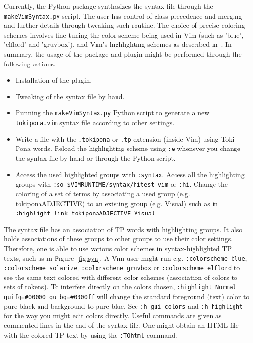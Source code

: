 \documentclass{article}
\newcommand{\tttt}[1]{\texttt{#1}}
\begin{document}
Currently, the Python package synthesizes the
syntax file through the\\ \tttt{makeVimSyntax.py} script.
The user has control of class precedence and
merging and further details through tweaking such routine.
The choice of precise coloring schemes
involves fine tuning the color scheme being
used in Vim (such as 'blue', 'elflord' and 'gruvbox'),
and Vim's highlighting schemes as described in~\cite{vim}.
In summary,
the usage of the package and plugin might be performed
through the following actions:
\begin{itemize}
  \item Installation of the plugin.
  \item Tweaking of the syntax file by hand.
  \item Running the \tttt{makeVimSyntax.py}
    Python script to generate a new \tttt{tokipona.vim} syntax file
    according to other settings.
  \item Write a file with the \tttt{.tokipona} or \tttt{.tp} extension
    (inside Vim) using Toki Pona words.
    Reload the highlighting scheme using \tttt{:e} whenever you
    change the syntax file by hand or through the Python script.
  \item Access the used highlighted groups with \tttt{:syntax}.
    Access all the highlighting groups with \tttt{:so
    \$VIMRUNTIME/syntax/hitest.vim} or \tttt{:hi}.
    Change the coloring of a set of terms by associating
    a used group (e.g. tokiponaADJECTIVE) to an existing group (e.g.
    Visual) such as in \tttt{:highlight link tokiponaADJECTIVE Visual}.
\end{itemize}

The syntax file has an association of TP
words with highlighting groups.
It also holds associations of these groups to other groups
to use their color settings.
Therefore, one is able to use various color schemes
in syntax-highlighted TP texts, such as in Figure~\ref{fig:syn}.
A Vim user might run e.g. \tttt{:colorscheme blue},
\tttt{:colorscheme solarize}, \tttt{:colorscheme gruvbox} or
\tttt{:colorscheme elflord} to see the same text colored
with different color schemes (association of colors to sets of tokens).
To interfere directly on the colors chosen,
\tttt{:highlight Normal guifg=\#00000 guibg=\#0000ff}
will change the standard foreground (text) color to pure black
and background to pure blue.
See \tttt{:h gui-colors} and \tttt{:h highlight}
for the way you might edit colors directly.
Useful commands are given as commented lines
in the end of the syntax file. %
One might obtain an HTML file with the colored TP text
by using the \tttt{:TOhtml} command.
\end{document}
